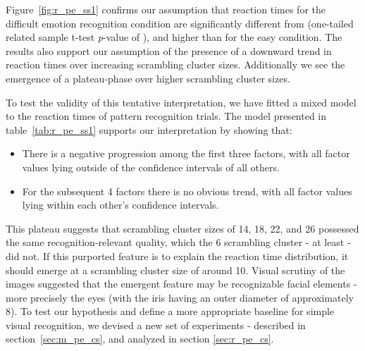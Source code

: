 	    Figure~\ref{fig:r_pe_ss1} confirms our assumption that reaction times for the difficult emotion recognition condition are significantly different from (one-tailed related sample t-test \textit{p}-value of 
	    ),
	    and higher than for the easy condition.
	    The results also support our assumption of the presence of a downward trend in reaction times over increasing scrambling cluster sizes.
	    Additionally we see the emergence of a plateau-phase over higher scrambling cluster sizes.
	    
	    To test the validity of this tentative interpretation, we have fitted a mixed model to the reaction times of pattern recognition trials.
	    The model presented in table~\ref{tab:r_pe_ss1} supports our interpretation by showing that:
	    \begin{itemize}
		\item There is a negative progression among the first three factors, with all factor values lying outside of the confidence intervals of all others.
		\item For the subsequent 4 factors there is no obvious trend, with all factor values lying within each other's confidence intervals. 
	    \end{itemize}

	    This plateau suggests that scrambling cluster sizes of \SI{14}{\pixel}, \SI{18}{\pixel}, \SI{22}{\pixel}, and \SI{26}{\pixel} possessed the same recognition-relevant quality, which the \SI{6}{\pixel} scrambling cluster - at least - did not.
	    If this purported feature is to explain the reaction time distribution, it should emerge at a scrambling cluster size of around \SI{10}{\pixel}.
	    Visual scrutiny of the images suggested that the emergent feature may be recognizable facial elements - more precisely the eyes (with the iris having an outer diameter of approximately \SI{8}{\pixel}).
	    To test our hypothesis and define a more appropriate baseline for simple visual recognition, we devised a new set of experiments - described in section~\ref{sec:m_pe_cs}, and analyzed in section \ref{sec:r_pe_cs}.
	    
